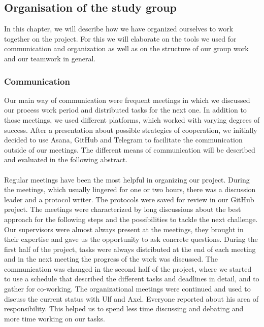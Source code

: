 \subsection{Organisation of the study group}
\label{sec:Organization}

In this chapter, we will describe how we have organized ourselves to work together on the project. For this we will elaborate on the tools we used for communication and organization as well as on the structure of our group work and our teamwork in general.


\subsubsection{Communication}
\label{subsec:Communication}

Our main way of communication were frequent meetings in which we discussed our process work period and distributed tasks for the next one. In addition to those meetings, we used different platforms, which worked with varying degrees of success. After a presentation about possible strategies of cooperation, we initially decided to use Asana, GitHub and Telegram to facilitate the communication outside of our meetings. The different means of communication will be described and evaluated in the following abstract. \\
\\
Regular meetings have been the most helpful in organizing our project. During the meetings, which usually lingered for one or two hours, there was a discussion leader and a protocol writer. The protocols were saved for review in our GitHub project. The meetings were characterized by long discussions about the best approach for the following steps and the possibilities to tackle the next challenge. Our supervisors were almost always present at the meetings, they brought in their expertise and gave us the opportunity to ask concrete questions. During the first half of the project, tasks were always distributed at the end of each meeting and in the next meeting the progress of the work was discussed. The communication was changed in the second half of the project,  where we started to use a schedule that described the different tasks and deadlines in detail, and to gather for co-working. The organizational meetings were continued and used to discuss the current status with Ulf and Axel. Everyone reported about his area of responsibility. This helped us to spend less time discussing and debating and more time working on our tasks. \\
